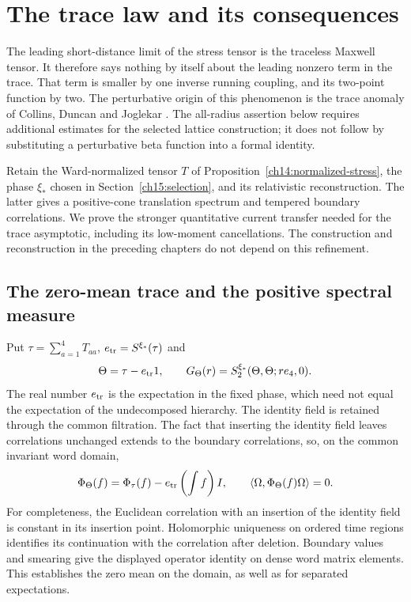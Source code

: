 \chapter{The trace law and its consequences}
\label{ch17:trace}

The leading short-distance limit of the stress tensor is the traceless
Maxwell tensor. It therefore says nothing by itself about the leading
nonzero term in the trace. That term is smaller by one inverse running
coupling, and its two-point function by two. The perturbative origin of
this phenomenon is the trace anomaly of Collins, Duncan and Joglekar
\cite{CollinsDuncanJoglekar1977}. The all-radius assertion below requires
additional estimates for the selected lattice construction; it does not
follow by substituting a perturbative beta function into a formal identity.

Retain the Ward-normalized tensor $T$ of
Proposition~\ref{ch14:normalized-stress}, the phase $\xi_*$ chosen in
Section~\ref{ch15:selection}, and its relativistic reconstruction.
The latter gives a positive-cone translation spectrum and tempered
boundary correlations. We prove the stronger quantitative current
transfer needed for the trace asymptotic, including its low-moment
cancellations. The construction and reconstruction in the preceding
chapters do not depend on this refinement.

\section{The zero-mean trace and the positive spectral measure}
\label{ch17:spectrum}

Put $\tau=\sum_{a=1}^4T_{aa}$, $e_{\rm tr}=S^{\xi_*}(\tau)$ and
\[
             \Theta=\tau-e_{\rm tr}1,\qquad
             G_\Theta(r)=S_2^{\xi_*}(\Theta,\Theta;re_4,0).
\]
The real number $e_{\rm tr}$ is the expectation in the fixed phase,
which need not equal the expectation of the undecomposed hierarchy. The identity field is retained
through the common filtration. The fact that inserting the identity field leaves correlations unchanged extends to
the boundary correlations, so, on the common invariant word domain,
\[
 \Phi_\Theta(f)=\Phi_\tau(f)
                  -e_{\rm tr}\left(\int f\right)I,
             \qquad \langle\Omega,\Phi_\Theta(f)\Omega\rangle=0.
\]
For completeness, the Euclidean correlation with an insertion of the identity field is
constant in its insertion point. Holomorphic uniqueness on ordered
time regions identifies its continuation with the correlation after
deletion. Boundary values and smearing give the displayed operator
identity on dense word matrix elements. This establishes the zero mean on
the domain, as well as for separated expectations.

